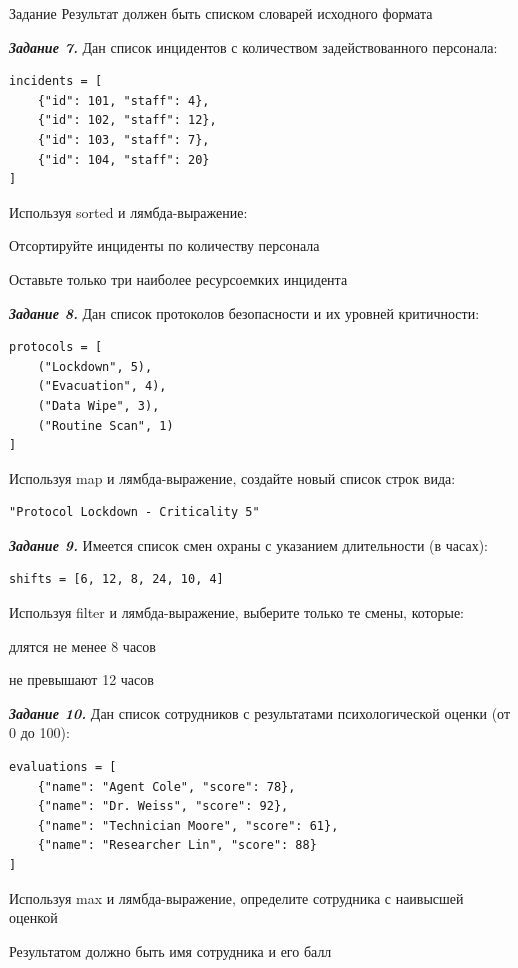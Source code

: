 \documentclass{vvsu}
\begin{document}
\begin{addition}{Задание}
  Результат должен быть списком словарей исходного формата

  \textit{\textbf{Задание 7.}}  
  Дан список инцидентов с количеством задействованного персонала:
\begin{lstlisting}[basicstyle=\ttfamily\small]
incidents = [
    {"id": 101, "staff": 4},
    {"id": 102, "staff": 12},
    {"id": 103, "staff": 7},
    {"id": 104, "staff": 20}
]
\end{lstlisting}
Используя sorted и лямбда-выражение:
\begin{vvsu_list}
  \item Отсортируйте инциденты по количеству персонала
  \item Оставьте только три наиболее ресурсоемких инцидента
\end{vvsu_list}

  \textit{\textbf{Задание 8.}}  
  Дан список протоколов безопасности и их уровней критичности:
\begin{lstlisting}[basicstyle=\ttfamily\small]
protocols = [
    ("Lockdown", 5),
    ("Evacuation", 4),
    ("Data Wipe", 3),
    ("Routine Scan", 1)
]
\end{lstlisting}

Используя map и лямбда-выражение, создайте новый список строк вида:
\begin{lstlisting}[basicstyle=\ttfamily\small]
"Protocol Lockdown - Criticality 5"
\end{lstlisting}


  \textit{\textbf{Задание 9.}}  
Имеется список смен охраны с указанием длительности (в часах):
 \begin{lstlisting}[basicstyle=\ttfamily\small]
shifts = [6, 12, 8, 24, 10, 4]
\end{lstlisting}
Используя filter и лямбда-выражение, выберите только те смены, которые:
  \begin{vvsu_list}
    \item длятся не менее 8 часов
    \item не превышают 12 часов
\end{vvsu_list}

  \textit{\textbf{Задание 10.}}  
  Дан список сотрудников с результатами психологической оценки (от 0 до 100):
 \begin{lstlisting}[basicstyle=\ttfamily\small]
evaluations = [
    {"name": "Agent Cole", "score": 78},
    {"name": "Dr. Weiss", "score": 92},
    {"name": "Technician Moore", "score": 61},
    {"name": "Researcher Lin", "score": 88}
]
\end{lstlisting}
Используя max и лямбда-выражение, определите сотрудника с наивысшей оценкой

Результатом должно быть имя сотрудника и его балл
\end{addition}
\end{document}
